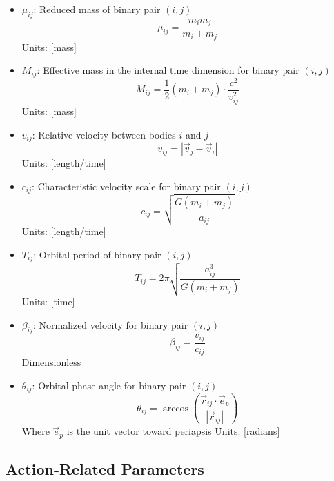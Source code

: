 \documentclass{article}
\begin{document}
\begin{itemize}
\item $\mu_{ij}$: Reduced mass of binary pair $(i,j)$
    \begin{equation}
    \mu_{ij} = \frac{m_i m_j}{m_i + m_j}
    \end{equation}
    Units: [mass]

\item $M_{ij}$: Effective mass in the internal time dimension for binary pair $(i,j)$
    \begin{equation}
    M_{ij} = \frac{1}{2}(m_i + m_j) \cdot \frac{c^2}{v_{ij}^2}
    \end{equation}
    Units: [mass]
    
\item $v_{ij}$: Relative velocity between bodies $i$ and $j$
    \begin{equation}
    v_{ij} = |\vec{v}_j - \vec{v}_i|
    \end{equation}
    Units: [length/time]
    
\item $c_{ij}$: Characteristic velocity scale for binary pair $(i,j)$
    \begin{equation}
    c_{ij} = \sqrt{\frac{G(m_i+m_j)}{a_{ij}}}
    \end{equation}
    Units: [length/time]

\item $T_{ij}$: Orbital period of binary pair $(i,j)$
    \begin{equation}
    T_{ij} = 2\pi\sqrt{\frac{a_{ij}^3}{G(m_i+m_j)}}
    \end{equation}
    Units: [time]
    
\item $\beta_{ij}$: Normalized velocity for binary pair $(i,j)$
    \begin{equation}
    \beta_{ij} = \frac{v_{ij}}{c_{ij}}
    \end{equation}
    Dimensionless
    
\item $\theta_{ij}$: Orbital phase angle for binary pair $(i,j)$
    \begin{equation}
    \theta_{ij} = \arccos\left(\frac{\vec{r}_{ij} \cdot \vec{e}_{p}}{|\vec{r}_{ij}|}\right)
    \end{equation}
    Where $\vec{e}_{p}$ is the unit vector toward periapsis
    Units: [radians]
\end{itemize}

\subsection{Action-Related Parameters}
\end{document}
